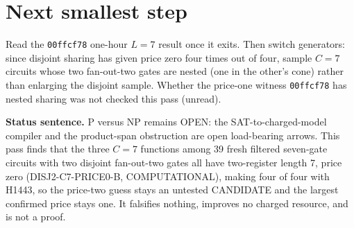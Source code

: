 \documentclass[11pt]{article}
\begin{document}
\section*{Next smallest step}
Read the \texttt{00ffcf78} one-hour $L=7$ result once it exits. Then switch generators: since disjoint sharing has given price zero four times out of four, sample $C=7$ circuits whose two fan-out-two gates are nested (one in the other's cone) rather than enlarging the disjoint sample. Whether the price-one witness \texttt{00ffcf78} has nested sharing was not checked this pass (unread).

\bigskip
\noindent\textbf{Status sentence.} P versus NP remains OPEN: the SAT-to-charged-model compiler and the product-span obstruction are open load-bearing arrows. This pass finds that the three $C=7$ functions among 39 fresh filtered seven-gate circuits with two disjoint fan-out-two gates all have two-register length 7, price zero (DISJ2-C7-PRICE0-B, COMPUTATIONAL), making four of four with H1443, so the price-two guess stays an untested CANDIDATE and the largest confirmed price stays one. It falsifies nothing, improves no charged resource, and is not a proof.
\end{document}
